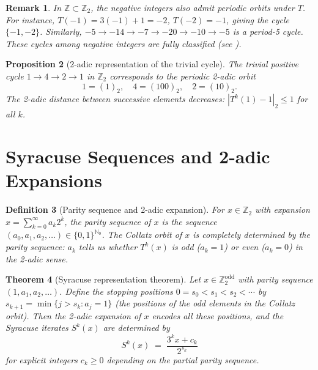 \documentclass[12pt,a4paper]{article}
\newtheorem{theorem}{Theorem}[section]
\newtheorem{proposition}[theorem]{Proposition}
\newtheorem{definition}[theorem]{Definition}
\newtheorem{remark}[theorem]{Remark}
\begin{document}
\begin{remark}\label{rem:negative}
In $\mathbb{Z} \subset \mathbb{Z}_2$, the negative integers also admit periodic orbits
under $T$. For instance, $T(-1) = 3(-1)+1 = -2$, $T(-2) = -1$, giving the cycle
$\{-1, -2\}$. Similarly, $-5 \to -14 \to -7 \to -20 \to -10 \to -5$ is a period-5 cycle.
These cycles among negative integers are fully classified (see \cite{Lagarias1985}).
\end{remark}

\begin{proposition}[2-adic representation of the trivial cycle]\label{prop:trivial_cycle_2adic}
The trivial positive cycle $1 \to 4 \to 2 \to 1$ in $\mathbb{Z}_2$ corresponds to the
periodic 2-adic orbit
\[
  1 = (1)_2, \quad 4 = (100)_2, \quad 2 = (10)_2.
\]
The 2-adic distance between successive elements decreases: $|T^k(1) - 1|_2 \leq 1$ for all $k$.
\end{proposition}

\section{Syracuse Sequences and 2-adic Expansions}\label{sec:syracuse}

\begin{definition}[Parity sequence and 2-adic expansion]\label{def:parity}
For $x \in \mathbb{Z}_2$ with expansion $x = \sum_{k=0}^\infty a_k 2^k$, the
\emph{parity sequence} of $x$ is the sequence $(a_0, a_1, a_2, \ldots) \in \{0,1\}^{\mathbb{N}_0}$.
The Collatz orbit of $x$ is completely determined by the parity sequence:
$a_k$ tells us whether $T^k(x)$ is odd ($a_k = 1$) or even ($a_k = 0$) in the 2-adic sense.
\end{definition}

\begin{theorem}[Syracuse representation theorem]\label{thm:syracuse_rep}
Let $x \in \mathbb{Z}_2^{\text{odd}}$ with parity sequence $(1, a_1, a_2, \ldots)$.
Define the stopping positions $0 = s_0 < s_1 < s_2 < \cdots$ by
$s_{k+1} = \min\{j > s_k : a_j = 1\}$
(the positions of the odd elements in the Collatz orbit).
Then the 2-adic expansion of $x$ encodes all these positions, and the Syracuse iterates
$S^k(x)$ are determined by
\[
  S^k(x) \;=\; \frac{3^k x + c_k}{2^{s_k}}
\]
for explicit integers $c_k \geq 0$ depending on the partial parity sequence.
\end{theorem}
\end{document}
